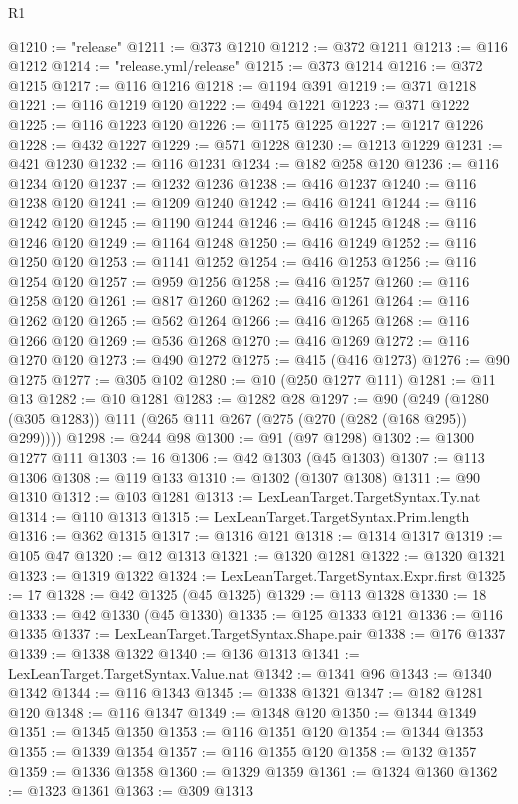 \begin{lexlean}{R1}
\begin{coremodule}
@1210 := "release"
@1211 := @373 @1210
@1212 := @372 @1211
@1213 := @116 @1212
@1214 := "release.yml/release"
@1215 := @373 @1214
@1216 := @372 @1215
@1217 := @116 @1216
@1218 := @1194 @391
@1219 := @371 @1218
@1221 := @116 @1219 @120
@1222 := @494 @1221
@1223 := @371 @1222
@1225 := @116 @1223 @120
@1226 := @1175 @1225
@1227 := @1217 @1226
@1228 := @432 @1227
@1229 := @571 @1228
@1230 := @1213 @1229
@1231 := @421 @1230
@1232 := @116 @1231
@1234 := @182 @258 @120
@1236 := @116 @1234 @120
@1237 := @1232 @1236
@1238 := @416 @1237
@1240 := @116 @1238 @120
@1241 := @1209 @1240
@1242 := @416 @1241
@1244 := @116 @1242 @120
@1245 := @1190 @1244
@1246 := @416 @1245
@1248 := @116 @1246 @120
@1249 := @1164 @1248
@1250 := @416 @1249
@1252 := @116 @1250 @120
@1253 := @1141 @1252
@1254 := @416 @1253
@1256 := @116 @1254 @120
@1257 := @959 @1256
@1258 := @416 @1257
@1260 := @116 @1258 @120
@1261 := @817 @1260
@1262 := @416 @1261
@1264 := @116 @1262 @120
@1265 := @562 @1264
@1266 := @416 @1265
@1268 := @116 @1266 @120
@1269 := @536 @1268
@1270 := @416 @1269
@1272 := @116 @1270 @120
@1273 := @490 @1272
@1275 := @415 (@416 @1273)
@1276 := @90 @1275
@1277 := @305 @102
@1280 := @10 (@250 @1277 @111)
@1281 := @11 @13
@1282 := @10 @1281
@1283 := @1282 @28
@1297 := @90 (@249 (@1280 (@305 @1283)) @111 (@265 @111 @267 (@275 (@270 (@282 (@168 @295)) @299))))
@1298 := @244 @98
@1300 := @91 (@97 @1298)
@1302 := @1300 @1277 @111
@1303 := 16
@1306 := @42 @1303 (@45 @1303)
@1307 := @113 @1306
@1308 := @119 @133
@1310 := @1302 (@1307 @1308)
@1311 := @90 @1310
@1312 := @103 @1281
@1313 := LexLeanTarget.TargetSyntax.Ty.nat
@1314 := @110 @1313
@1315 := LexLeanTarget.TargetSyntax.Prim.length
@1316 := @362 @1315
@1317 := @1316 @121
@1318 := @1314 @1317
@1319 := @105 @47
@1320 := @12 @1313
@1321 := @1320 @1281
@1322 := @1320 @1321
@1323 := @1319 @1322
@1324 := LexLeanTarget.TargetSyntax.Expr.first
@1325 := 17
@1328 := @42 @1325 (@45 @1325)
@1329 := @113 @1328
@1330 := 18
@1333 := @42 @1330 (@45 @1330)
@1335 := @125 @1333 @121
@1336 := @116 @1335
@1337 := LexLeanTarget.TargetSyntax.Shape.pair
@1338 := @176 @1337
@1339 := @1338 @1322
@1340 := @136 @1313
@1341 := LexLeanTarget.TargetSyntax.Value.nat
@1342 := @1341 @96
@1343 := @1340 @1342
@1344 := @116 @1343
@1345 := @1338 @1321
@1347 := @182 @1281 @120
@1348 := @116 @1347
@1349 := @1348 @120
@1350 := @1344 @1349
@1351 := @1345 @1350
@1353 := @116 @1351 @120
@1354 := @1344 @1353
@1355 := @1339 @1354
@1357 := @116 @1355 @120
@1358 := @132 @1357
@1359 := @1336 @1358
@1360 := @1329 @1359
@1361 := @1324 @1360
@1362 := @1323 @1361
@1363 := @309 @1313

\end{coremodule}
\end{lexlean}
